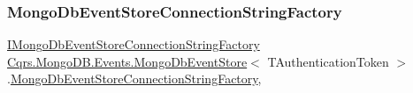 \subsubsection{\texorpdfstring{Mongo\+Db\+Event\+Store\+Connection\+String\+Factory}{MongoDbEventStoreConnectionStringFactory}}
{\footnotesize\ttfamily \hyperlink{interfaceCqrs_1_1MongoDB_1_1Events_1_1IMongoDbEventStoreConnectionStringFactory}{I\+Mongo\+Db\+Event\+Store\+Connection\+String\+Factory} \hyperlink{classCqrs_1_1MongoDB_1_1Events_1_1MongoDbEventStore}{Cqrs.\+Mongo\+D\+B.\+Events.\+Mongo\+Db\+Event\+Store}$<$ T\+Authentication\+Token $>$.\hyperlink{classCqrs_1_1MongoDB_1_1Events_1_1MongoDbEventStoreConnectionStringFactory}{Mongo\+Db\+Event\+Store\+Connection\+String\+Factory}\hspace{0.3cm}{\ttfamily [get]}, {\ttfamily [protected]}}

